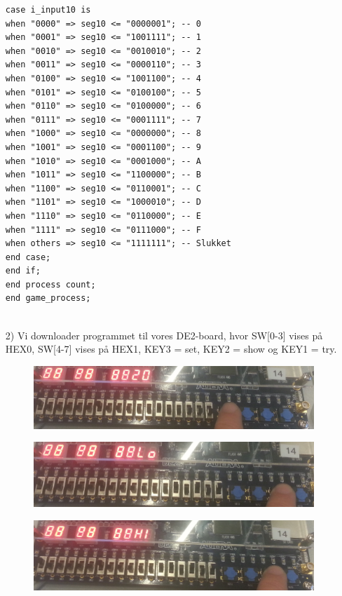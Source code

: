 \begin{enumerate}
\begin{lstlisting}[caption={Behavioral style kode for Guessgame},label={lst:Guessgame}]
case i_input10 is
when "0000" => seg10 <= "0000001"; -- 0
when "0001" => seg10 <= "1001111"; -- 1
when "0010" => seg10 <= "0010010"; -- 2
when "0011" => seg10 <= "0000110"; -- 3
when "0100" => seg10 <= "1001100"; -- 4
when "0101" => seg10 <= "0100100"; -- 5
when "0110" => seg10 <= "0100000"; -- 6
when "0111" => seg10 <= "0001111"; -- 7
when "1000" => seg10 <= "0000000"; -- 8
when "1001" => seg10 <= "0001100"; -- 9
when "1010" => seg10 <= "0001000"; -- A
when "1011" => seg10 <= "1100000"; -- B
when "1100" => seg10 <= "0110001"; -- C
when "1101" => seg10 <= "1000010"; -- D
when "1110" => seg10 <= "0110000"; -- E
when "1111" => seg10 <= "0111000"; -- F
when others => seg10 <= "1111111"; -- Slukket
end case;
end if;
end process count;
end game_process;


	\end{lstlisting}
	\item[2)]
	Vi downloader programmet til vores DE2-board, hvor SW[0-3] vises på HEX0, SW[4-7] vises på HEX1, KEY3 = set, KEY2 = show og KEY1 = try. \\
	\begin{figure}[h]
		\centering
		\includegraphics[scale=0.8]{pictures/Oevelse5/opg3/guess_set.JPG}
		\caption{}
		\label{fig:GuessSet}
	\end{figure}
	\begin{figure}[h]
		\centering
		\includegraphics[scale=0.8]{pictures/Oevelse5/opg3/guess_try_lo.JPG}
		\caption{}
		\label{fig:GuessTryLo}
	\end{figure}
	\begin{figure}[h]
		\centering
		\includegraphics[scale=0.8]{pictures/Oevelse5/opg3/guess_try_hi.JPG}

\end{figure}
\end{enumerate}
